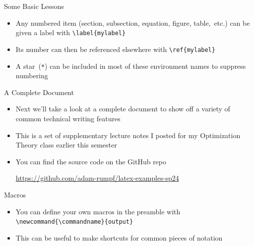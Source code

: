 \documentclass{beamer} %
\begin{document}
\begin{frame}{Some Basic Lessons}

\begin{itemize}
	\item Any numbered item (section, subsection, equation, figure, table,~etc.) can be given a label with {\tt \textbackslash label\{mylabel\}}
	\item Its number can then be referenced elsewhere with {\tt \textbackslash ref\{mylabel\}}
	\item A star~(\texttt{*}) can be included in most of these environment names to suppress numbering
\end{itemize}

\end{frame}

\begin{frame}{A Complete Document}

\begin{itemize}
	\item Next we'll take a look at a complete document to show off a variety of common technical writing features
	\item This is a set of supplementary lecture notes I posted for my Optimization Theory class earlier this semester
	\item You can find the source code on the GitHub repo
	
	\url{https://github.com/adam-rumpf/latex-examples-sp24}
\end{itemize}

\end{frame}

\begin{frame}{Macros}

\begin{itemize}
	\item You can define your own macros in the preamble with {\tt \textbackslash newcommand\{\textbackslash commandname\}\{output\}}
	\item This can be useful to make shortcuts for common pieces of notation
\end{itemize}

\end{frame}
\end{document}
